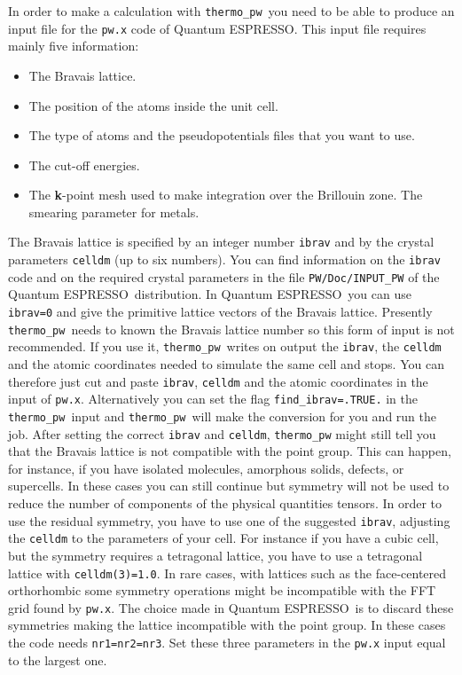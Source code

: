 \documentclass[12pt,a4paper]{article}
\def\qe{{\sc Quantum ESPRESSO}}
\def\thermo{\texttt{thermo\_pw}}
\begin{document}
In order to make a calculation with \thermo\ you need to be able to 
produce an input file for the \texttt{pw.x} code of \qe. This input file
requires mainly five information:
\begin{itemize}
\item The Bravais lattice.

\item The position of the atoms inside the unit cell.

\item The type of atoms and the pseudopotentials files that you want to use.

\item The cut-off energies.

\item The {\bf k}-point mesh used to make integration over
the Brillouin zone. The smearing parameter for metals. 
\end{itemize}

The Bravais lattice is specified by an integer number \texttt{ibrav} and by the
crystal parameters \texttt{celldm} (up to six numbers). You can find 
information on the \texttt{ibrav} code and on the required crystal parameters
in the file \texttt{PW/Doc/INPUT\_PW} of the \qe\ distribution. 
In \qe\ you can use \texttt{ibrav=0} and give the primitive
lattice vectors of the Bravais lattice. Presently \thermo\ needs to
known the Bravais lattice number so this form of input is not recommended. 
If you use it, \thermo\ writes on output the \texttt{ibrav}, the 
\texttt{celldm} and the atomic coordinates needed to simulate
the same cell and stops.
You can therefore just cut and paste \texttt{ibrav}, \texttt{celldm} 
and the atomic coordinates in the input of \texttt{pw.x}. Alternatively
you can set the flag \texttt{find\_ibrav=.TRUE.} in the \thermo\ input
and \thermo\ will make the conversion for you and run the job. 
After setting the correct
\texttt{ibrav} and \texttt{celldm}, \texttt{thermo\_pw} might still tell you
that the Bravais lattice is not compatible with the point group. This
can happen, for instance, if you have isolated molecules, amorphous solids,
defects, or supercells. In these cases you can still continue but symmetry 
will not be 
used to reduce the number of components of the physical quantities tensors. 
In order to use the residual symmetry, you have to
use one of the suggested \texttt{ibrav}, adjusting the \texttt{celldm} to
the parameters of your cell. For instance if you have a cubic cell, but
the symmetry requires a tetragonal lattice, you have to use a tetragonal
lattice with \texttt{celldm(3)=1.0}.
In rare cases, with lattices such as the face-centered orthorhombic some
symmetry operations might be incompatible with the FFT grid found by 
\texttt{pw.x}. The choice made in \qe\ is to discard these symmetries making
the lattice incompatible with the point group. In these cases the code needs 
\texttt{nr1=nr2=nr3}. Set these three parameters in the \texttt{pw.x} input 
equal to the largest one. 
\end{document}
